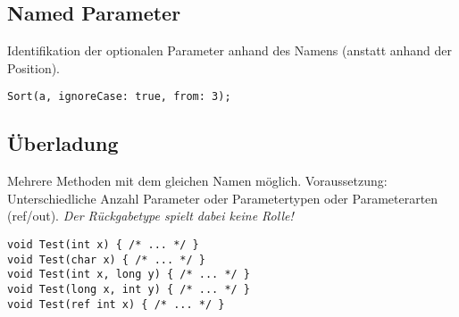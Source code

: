 \subsection{Named Parameter}
Identifikation der optionalen Parameter anhand des Namens (anstatt anhand der Position). 
\begin{lstlisting}
Sort(a, ignoreCase: true, from: 3);
\end{lstlisting}

\subsection{Überladung}
Mehrere Methoden mit dem gleichen Namen möglich. Voraussetzung: Unterschiedliche Anzahl Parameter oder Parametertypen oder Parameterarten (ref/out). \textit{Der Rückgabetype spielt dabei keine Rolle!}
\begin{lstlisting}
void Test(int x) { /* ... */ } 
void Test(char x) { /* ... */ } 
void Test(int x, long y) { /* ... */ } 
void Test(long x, int y) { /* ... */ } 
void Test(ref int x) { /* ... */ }
\end{lstlisting}



\pagebreak

